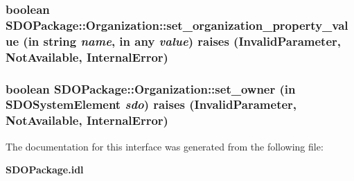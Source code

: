 \subsubsection[{set\_\-organization\_\-property\_\-value}]{\setlength{\rightskip}{0pt plus 5cm}boolean SDOPackage::Organization::set\_\-organization\_\-property\_\-value (in string {\em name}, \/  in any {\em value})  raises (InvalidParameter, NotAvailable, InternalError)}\label{interfaceSDOPackage_1_1Organization_a4d38682f8fdd019d229aee109f2de1f1}
\subsubsection[{set\_\-owner}]{\setlength{\rightskip}{0pt plus 5cm}boolean SDOPackage::Organization::set\_\-owner (in {\bf SDOSystemElement} {\em sdo})  raises (InvalidParameter, NotAvailable, InternalError)}\label{interfaceSDOPackage_1_1Organization_a8b747ff46647c4d2e28df2e9b9de325b}


The documentation for this interface was generated from the following file:\begin{DoxyCompactItemize}
\item 
{\bf SDOPackage.idl}\end{DoxyCompactItemize}
